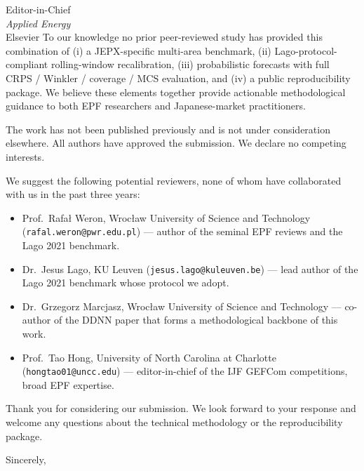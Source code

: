 \documentclass[11pt,a4paper]{letter}
\begin{document}
\begin{letter}{Editor-in-Chief \\ \emph{Applied Energy} \\ Elsevier}
To our knowledge no prior peer-reviewed study has provided this combination of (i) a JEPX-specific multi-area benchmark, (ii) Lago-protocol-compliant rolling-window recalibration, (iii) probabilistic forecasts with full CRPS / Winkler / coverage / MCS evaluation, and (iv) a public reproducibility package. We believe these elements together provide actionable methodological guidance to both EPF researchers and Japanese-market practitioners.

The work has not been published previously and is not under consideration elsewhere. All authors have approved the submission. We declare no competing interests.

We suggest the following potential reviewers, none of whom have collaborated with us in the past three years:
\begin{itemize}
\item Prof.\ Rafa\l{} Weron, Wroc\l{}aw University of Science and Technology (\texttt{rafal.weron@pwr.edu.pl}) --- author of the seminal EPF reviews and the Lago 2021 benchmark.
\item Dr.\ Jesus Lago, KU Leuven (\texttt{jesus.lago@kuleuven.be}) --- lead author of the Lago 2021 benchmark whose protocol we adopt.
\item Dr.\ Grzegorz Marcjasz, Wroc\l{}aw University of Science and Technology --- co-author of the DDNN paper that forms a methodological backbone of this work.
\item Prof.\ Tao Hong, University of North Carolina at Charlotte (\texttt{hongtao01@uncc.edu}) --- editor-in-chief of the IJF GEFCom competitions, broad EPF expertise.
\end{itemize}

Thank you for considering our submission. We look forward to your response and welcome any questions about the technical methodology or the reproducibility package.

\closing{Sincerely,}

\end{letter}
\end{document}
